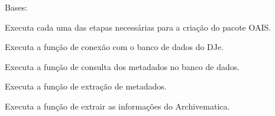 \documentclass[letterpaper,10pt,english]{sphinxmanual}
\begin{document}
\begin{fulllineitems}
\label{\detokenize{ClasseGeral:ClasseGeral.Geral}}
Bases: 

Executa cada uma das etapas necessárias para a criação do pacote OAIS.

\begin{fulllineitems}
\label{\detokenize{ClasseGeral:ClasseGeral.Geral.conexaoBanco}}
Executa a função de conexão com o banco de dados do DJe.

\end{fulllineitems}


\begin{fulllineitems}
\label{\detokenize{ClasseGeral:ClasseGeral.Geral.geradorConsultas}}
Executa a função de consulta dos metadados no banco de dados.

\end{fulllineitems}


\begin{fulllineitems}
\label{\detokenize{ClasseGeral:ClasseGeral.Geral.geradorMetadatas}}
Executa a função de extração de metadados.

\end{fulllineitems}


\begin{fulllineitems}
\label{\detokenize{ClasseGeral:ClasseGeral.Geral.infoArchivematica}}
Executa a função de extrair as informações do Archivematica.


\end{fulllineitems}
\end{fulllineitems}
\end{document}
